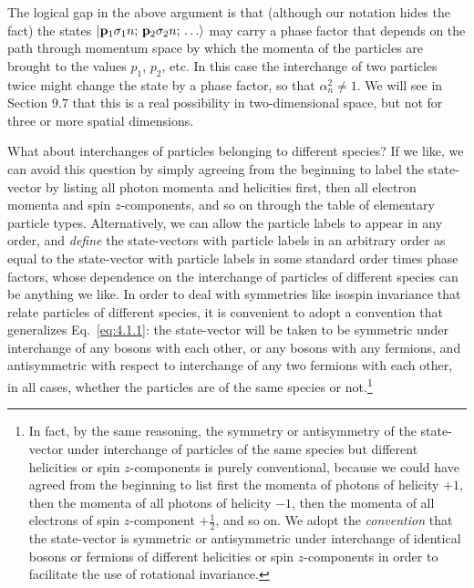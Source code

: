 The logical gap in the above argument is that (although our notation
hides the fact) the states $\lvert \mathbf p_1\sigma_1n;\,\mathbf p_2\sigma_2n;\,\ldots\rangle$ may carry a
phase factor that depends on the path through momentum space by which the momenta
of the particles are brought to the values $p_1$, $p_2$, etc. In this case the
interchange of two particles twice might change the state by a phase
factor, so that $\alpha_n^2\ne1$. We will see in Section 9.7 that this is a real
possibility in two-dimensional space, but not for three or more spatial
dimensions.

What about interchanges of particles belonging to different species? If
we like, we can avoid this question by simply agreeing from the beginning
to label the state-vector by listing all photon momenta and helicities first,
then all electron momenta and spin $z$-components, and so on through the
table of elementary particle types. Alternatively, we can allow the particle
labels to appear in any order, and \textit{define} the state-vectors with particle
labels in an arbitrary order as equal to the state-vector with particle
labels in some standard order times phase factors, whose dependence
on the interchange of particles of different species can be anything we
like. In order to deal with symmetries like isospin invariance that relate
particles of different species, it is convenient to adopt a convention that
generalizes Eq.~\eqref{eq:4.1.1}: the state-vector will be taken to be symmetric
under interchange of any bosons with each other, or any bosons with
any fermions, and antisymmetric with respect to interchange of any two
fermions with each other, in all cases, whether the particles are of the
same species or not.\footnote{In fact, by the same reasoning, the symmetry or
antisymmetry of the state-vector under interchange of particles of the same
species but different helicities or spin $z$-components is purely conventional,
because we could have agreed from the beginning to list first the momenta of
photons of helicity $+1$, then the momenta of all photons of helicity $-1$, then
the momenta of all electrons of spin $z$-component $+\tfrac12$, and so on. We
adopt the \textit{convention} that the state-vector is symmetric or antisymmetric
under interchange of identical bosons or fermions of different helicities or
spin $z$-components in order to facilitate the use of rotational invariance.}


